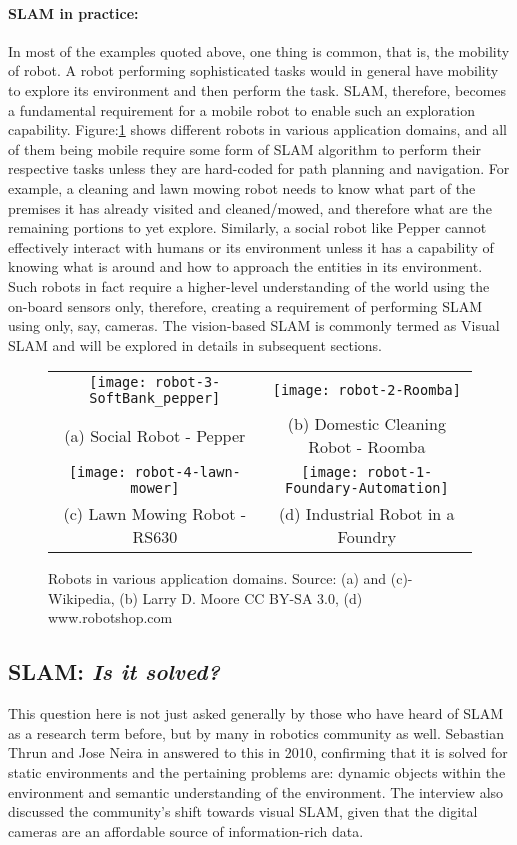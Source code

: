 \documentclass{article}
\begin{document}
\paragraph{SLAM in practice:} 
In most of the examples quoted above, one thing is common, that is, the mobility of robot. A robot performing sophisticated tasks would in general have mobility to explore its environment and then perform the task. SLAM, therefore, becomes a fundamental requirement for a mobile robot to enable such an exploration capability. Figure:\ref{fig:robots} shows different robots in various application domains, and all of them being mobile require some form of SLAM algorithm to perform their respective tasks unless they are hard-coded for path planning and navigation. For example, a cleaning and lawn mowing robot needs to know what part of the premises it has already visited and cleaned/mowed, and therefore what are the remaining portions to yet explore. Similarly, a social robot like Pepper cannot effectively interact with humans or its environment unless it has a capability of knowing what is around and how to approach the entities in its environment. Such robots in fact require a higher-level understanding of the world using the on-board sensors only, therefore, creating a requirement of performing SLAM using only, say, cameras. The vision-based SLAM is commonly termed as Visual SLAM and will be explored in details in subsequent sections.

\begin{figure}[htbp]
\centering
 \begin{tabular}{cc}
  \texttt{[image: robot-3-SoftBank\_pepper]} &
  \texttt{[image: robot-2-Roomba]} \\
 (a) Social Robot - Pepper &
  (b) Domestic Cleaning Robot - Roomba \\
  \texttt{[image: robot-4-lawn-mower]} &
  \texttt{[image: robot-1-Foundary-Automation]} \\
  (c) Lawn Mowing Robot - RS630 &
  (d) Industrial Robot in a Foundry \\
 \end{tabular}
 \caption{Robots in various application domains. Source: (a) and (c)- Wikipedia, (b) Larry D. Moore CC BY-SA 3.0, (d) www.robotshop.com }
 \label{fig:robots}
\end{figure}

\subsection{SLAM: \emph{Is it solved?}}
This question here is not just asked generally by those who have heard of SLAM as a research term before, but by many in robotics community as well. Sebastian Thrun and Jose Neira in \cite{frese2010interview} answered to this in 2010, confirming that it is solved for static environments and the pertaining problems are: dynamic objects within the environment and semantic understanding of the environment. The interview also discussed the community's shift towards visual SLAM, given that the digital cameras are an affordable source of information-rich data. 
\end{document}
